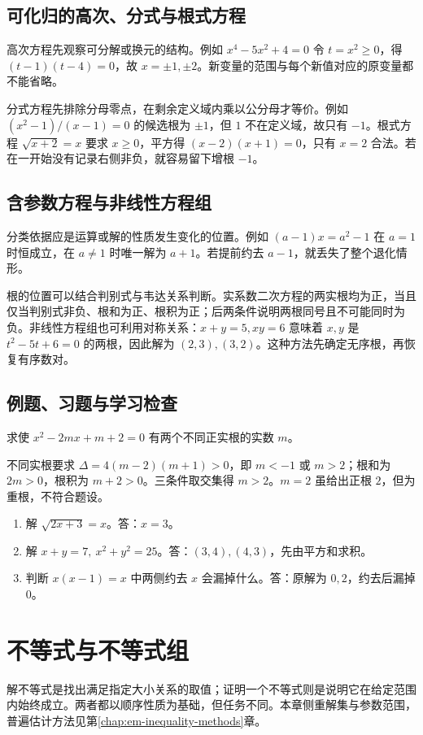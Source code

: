 \documentclass[UTF8]{ctexbook}
\begin{document}
\section{可化归的高次、分式与根式方程}
高次方程先观察可分解或换元的结构。例如 $x^4-5x^2+4=0$ 令 $t=x^2\ge0$，得 $(t-1)(t-4)=0$，故 $x=\pm1,\pm2$。新变量的范围与每个新值对应的原变量都不能省略。

分式方程先排除分母零点，在剩余定义域内乘以公分母才等价。例如 $(x^2-1)/(x-1)=0$ 的候选根为 $\pm1$，但 $1$ 不在定义域，故只有 $-1$。根式方程 $\sqrt{x+2}=x$ 要求 $x\ge0$，平方得 $(x-2)(x+1)=0$，只有 $x=2$ 合法。若在一开始没有记录右侧非负，就容易留下增根 $-1$。

\section{含参数方程与非线性方程组}
分类依据应是运算或解的性质发生变化的位置。例如 $(a-1)x=a^2-1$ 在 $a=1$ 时恒成立，在 $a\ne1$ 时唯一解为 $a+1$。若提前约去 $a-1$，就丢失了整个退化情形。

根的位置可以结合判别式与韦达关系判断。实系数二次方程的两实根均为正，当且仅当判别式非负、根和为正、根积为正；后两条件说明两根同号且不可能同时为负。非线性方程组也可利用对称关系：$x+y=5,xy=6$ 意味着 $x,y$ 是 $t^2-5t+6=0$ 的两根，因此解为 $(2,3),(3,2)$。这种方法先确定无序根，再恢复有序数对。

\section{例题、习题与学习检查}
\begin{example}
求使 $x^2-2mx+m+2=0$ 有两个不同正实根的实数 $m$。
\end{example}
\begin{solve}
不同实根要求 $\Delta=4(m-2)(m+1)>0$，即 $m<-1$ 或 $m>2$；根和为 $2m>0$，根积为 $m+2>0$。三条件取交集得 $m>2$。$m=2$ 虽给出正根 $2$，但为重根，不符合题设。
\end{solve}
\begin{enumerate}
\item 解 $\sqrt{2x+3}=x$。答：$x=3$。
\item 解 $x+y=7,\ x^2+y^2=25$。答：$(3,4),(4,3)$，先由平方和求积。
\item 判断 $x(x-1)=x$ 中两侧约去 $x$ 会漏掉什么。答：原解为 $0,2$，约去后漏掉 $0$。
\end{enumerate}

\chapter{不等式与不等式组}
\label{chap:em-solving-inequalities}
解不等式是找出满足指定大小关系的取值；证明一个不等式则是说明它在给定范围内始终成立。两者都以顺序性质为基础，但任务不同。本章侧重解集与参数范围，普遍估计方法见第\ref{chap:em-inequality-methods}章。
\end{document}
